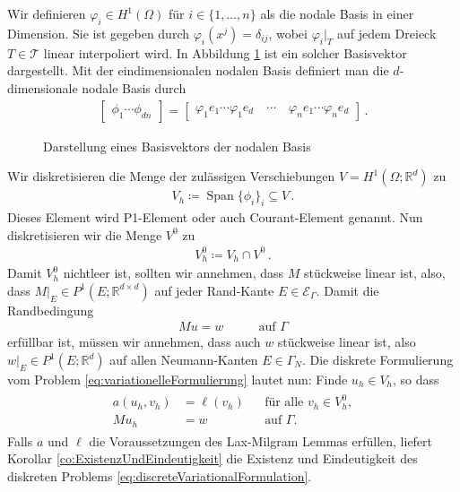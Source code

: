 \documentclass{scrartcl}
\def\R{\mathbb{R}}
\def\ev{e}
\newcommand{\cE}{\mathcal{E}}
\newcommand{\cN}{\mathcal{N}}
\newcommand{\cT}{\mathcal{T}}
\DeclareMathOperator{\Span}{Span}         %
\newcommand{\vect}[1]{\begin{bmatrix} #1 \end{bmatrix}}
\begin{document}
Wir definieren $\varphi_i\in H^1(\Omega)$ für $i\in\{1,\dots,n\}$ als die nodale Basis in einer Dimension. Sie ist gegeben durch $\varphi_i(x^{j}) = \delta_{ij}$,
wobei $\varphi_i\vert_T$ auf jedem Dreieck $T\in\cT$ linear interpoliert wird.
In Abbildung \ref{dr:NodalBasis} ist ein solcher Basisvektor dargestellt.
Mit der eindimensionalen nodalen Basis definiert man die $d$-dimensionale nodale Basis durch
\begin{align*}
	\vect{\phi_1\cdots\phi_{dn}}=\vect{\varphi_1\ev_1\cdots\varphi_1\ev_d\quad\cdots\quad\varphi_n \ev_1\cdots\varphi_n\ev_d}\,.
\end{align*}

\begin{figure}[h]
\centering

\caption{Darstellung eines Basisvektors der nodalen Basis}
\label{dr:NodalBasis}
\end{figure}



Wir diskretisieren die Menge der zulässigen Verschiebungen $V=H^1(\Omega;\R^d)$ zu
\begin{align}
	V_h \coloneqq \Span\{\phi_i\}_i\subseteq V\,.
	\label{eq:definitionVh}
\end{align}
Dieses Element wird P1-Element oder auch Courant-Element genannt. Nun diskretisieren wir die Menge $V^0$ zu
\begin{align}
	V_h^0\coloneqq V_h\cap V^0\,.
	\label{eq:definitionVhHom}
\end{align}
Damit $V_h^0$ nichtleer ist, sollten wir annehmen, dass $M$ stückweise linear ist, also, dass $M\big\vert_E\in P^1(E;\R^{d\times d})$ auf jeder Rand-Kante $E\in\cE_\Gamma$. Damit die Randbedingung
\begin{align*}
	Mu = w \qquad&\text{auf } \Gamma
\end{align*}
erfüllbar ist, müssen wir annehmen, dass auch $w$ stückweise linear ist, also $w\big\vert_E\in P^1(E;\R^d)$ auf allen Neumann-Kanten $E\in\Gamma_N$.
Die diskrete Formulierung vom Problem \eqref{eq:variationelleFormulierung} lautet nun: Finde $u_h\in V_h$, so dass
\begin{align}
	\begin{aligned}
	a(u_h,v_h) &= \ell(v_h) &&\text{für alle }v_h\in V_h^0, \\
	Mu_h &= w &&\text{auf }\Gamma.
	\end{aligned}
	\label{eq:discreteVariationalFormulation}
\end{align}
Falls $a$ und $\ell$ die Voraussetzungen des Lax-Milgram Lemmas erfüllen, liefert Korollar \ref{co:ExistenzUndEindeutigkeit} die Existenz und Eindeutigkeit des diskreten Problems \eqref{eq:discreteVariationalFormulation}.
\end{document}

